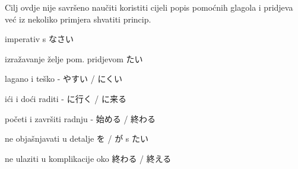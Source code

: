 
\author{Tomislav Mamić}

	
	Cilj ovdje nije savršeno naučiti koristiti cijeli popis pomoćnih glagola i pridjeva već iz nekoliko primjera shvatiti princip.
	
	\begin{hyou}
		\item imperativ s なさい
		\item izražavanje želje pom. pridjevom たい
		\item lagano i teško - やすい / にくい
		\item ići i doći raditi - に行く / に来る
		\item početi i završiti radnju - 始める / 終わる
	\end{hyou}

	\begin{hyou}
		\item ne objašnjavati u detalje を / が s たい
		\item ne ulaziti u komplikacije oko 終わる / 終える
	\end{hyou}

